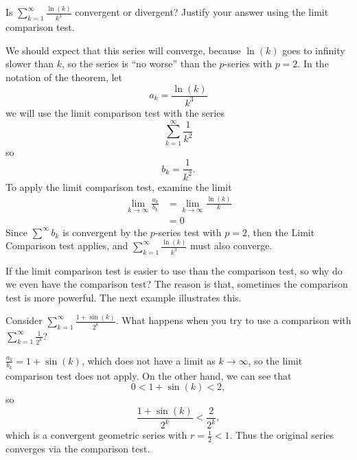 \documentclass{ximera}
\begin{document}
\begin{example}
  Is $\sum_{k=1}^\infty \frac{\ln(k)}{k^3}$ convergent or divergent?
  Justify your answer using the limit comparison test.
  \begin{explanation}
    We should expect that this series will converge, because $\ln(k)$
    goes to infinity slower than $k$, so the series is ``no worse''
    than the $p$-series with $p=2$. In the notation of the theorem,
    let
    \[
    a_k = \frac{\ln(k)}{k^3}
    \]
    we will use the limit comparison test with the series
    \[
    \sum_{k=1}^\infty \frac{1}{k^2}
    \]
    so
    \[
    b_k = \frac{1}{k^2}.
    \]
    To apply the limit comparison test, examine the limit
    \begin{align*}
    \lim_{k \to \infty} \frac{a_k}{b_k} &= \lim_{k \to \infty} \frac{\ln(k)}{k} \\
    &= 0
    \end{align*}
    Since $\sum^\infty b_k$ is convergent by the
    $p$-series test with $p=2$, then the Limit Comparison
    test applies, and $\sum_{k=1}^\infty \frac{\ln(k)}{k^3}$
    must also converge.
  \end{explanation}
\end{example}

If the limit comparison test is easier to use than the comparison
test, so why do we even have the comparison test?  The reason is that,
sometimes the comparison test is more powerful.  The next example
illustrates this.

\begin{question}
  Consider $\sum_{k=1}^\infty \frac{1+\sin(k)}{2^k}$.  What happens when you try to use a comparison with $\sum_{k=1}^\infty \frac{1}{2^k}$?
  \begin{selectAll}
  \end{selectAll}
  
  \begin{hint}
    $\frac{a_k}{b_k} = 1+\sin(k)$, which does not have a limit as $k
    \to \infty$, so the limit comparison test does not apply.  On the
    other hand, we can see that
    \[
    0<1+\sin(k)<2,
    \]
    so
    \[
    \frac{1+\sin(k)}{2^k} < \frac{2}{2^k},
    \]
    which is a convergent geometric series with $r = \frac{1}{2}<1$.
    Thus the original series converges via the comparison test.
  \end{hint}
\end{question}
\end{document}
